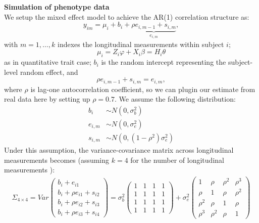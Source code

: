 \documentclass[compress]{beamer}
\begin{document}
\begin{frame}[allowframebreaks]
\framebreak
\textbf{Simulation of phenotype data}\\
We setup the mixed effect model to achieve the AR(1) correlation structure as:\\
\begin{equation}
y_{im} = \mu_{i} + b_i + \underbrace{ \rho e_{i,m-1} + s_{i,m} }_{ e_{i,m} }  ,
\label{eq:y_im_split}
\end{equation}
with $m = 1,\ldots,k$ indexes the longitudinal measurements within subject $i$; $$\mu_{i} = Z_i \varphi + X_i \beta = H_i \theta$$ as in quantitative trait case; $b_i$ is the random intercept representing the subject-level random effect, and
$$
\rho e_{i,m-1} + s_{i,m} = e_{i,m},
$$ 
where $\rho$ is lag-one autocorrelation coefficient, so we can plugin our estimate from real data here by setting up $\rho = 0.7$. We assume the following distribution:\\
\begin{align*}
b_i & \sim N(0,\sigma_b^2)\\
e_{i,m} & \sim  N(0, \sigma_e^2)\\
s_{i,m} & \sim  N(0, (1 - \rho^2) \sigma_e^2 )
\end{align*}
Under this assumption, the variance-covariance matrix across longitudinal measurements becomes (assuming $k = 4$ for the number of longitudinal measurements ):
\begin{eqnarray}
\Sigma_{4\times 4} = Var 
\begin{pmatrix}
b_i + e_{i1}\\
b_i + \rho e_{i1} + s_{i2}\\
b_i + \rho e_{i2} + s_{i3}\\
b_i + \rho e_{i3} + s_{i4}
\end{pmatrix}
= \sigma_b^2
\begin{pmatrix}
1 & 1 & 1 & 1\\
1 & 1 & 1 & 1\\
1 & 1 & 1 & 1\\
1 & 1 & 1 & 1
\end{pmatrix}
+ \sigma_e^2 
\begin{pmatrix}
1 & \rho & \rho^2 & \rho^3 \\
\rho & 1 & \rho & \rho^2 \\
\rho^2 & \rho & 1 & \rho \\
\rho^3 & \rho^2 & \rho & 1
\end{pmatrix}
\label{eq:v-cov_split}
\end{eqnarray}


\end{frame}
\end{document}
